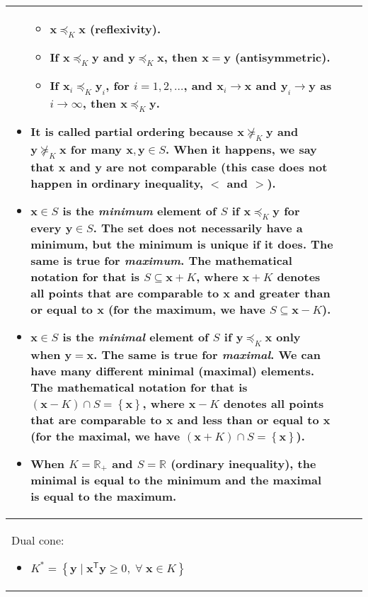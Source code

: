 \documentclass{article}
\begin{document}
\begin{table}[ht!]
\begin{tabularx}{\textwidth}{|A|B|C|}
\begin{itemize}[leftmargin=*]
\begin{itemize}[label={$\triangleright$}]
            \item \(\mathbf{x}\preceq_K \mathbf{x}\) (reflexivity).
            \item If \(\mathbf{x}\preceq_K \mathbf{y}\) and \(\mathbf{y}\preceq_K \mathbf{x}\), then \(\mathbf{x} = \mathbf{y}\) (antisymmetric).
            \item If \(\mathbf{x}_i\preceq_K \mathbf{y}_i\), for \(i = 1, 2, \dots\), and \(\mathbf{x}_i \rightarrow \mathbf{x}\) and \(\mathbf{y}_i \rightarrow \mathbf{y}\) as \(i \rightarrow \infty\), then \(\mathbf{x} \preceq_K \mathbf{y}\).
        \end{itemize}
    \item It is called partial ordering because \(\mathbf{x} \nsucceq_K \mathbf{y}\) and \(\mathbf{y} \nsucceq_K \mathbf{x}\) for many \(\mathbf{x}, \mathbf{y} \in S\). When it happens, we say that \(\mathbf{x}\) and \(\mathbf{y}\) are not comparable (this case does not happen in ordinary inequality, \(<\) and \(>\)).
    \item \(\mathbf{x} \in S\) is the \emph{minimum} element of \(S\) if \(\mathbf{x} \preceq_K \mathbf{y}\) for every \(\mathbf{y} \in S\). The set does not necessarily have a minimum, but the minimum is unique if it does. The same is true for \emph{maximum}. The mathematical notation for that is \(S \subseteq \mathbf{x} + K\), where \(\mathbf{x} + K\) denotes all points that are comparable to \(\mathbf{x}\) and greater than or equal to \(\mathbf{x}\) (for the maximum, we have \(S \subseteq \mathbf{x} - K\)).
    \item \(\mathbf{x} \in S\) is the \emph{minimal} element of \(S\) if \(\mathbf{y} \preceq_K \mathbf{x}\) only when \(\mathbf{y} = \mathbf{x}\). The same is true for \emph{maximal}. We can have many different minimal (maximal) elements. The mathematical notation for that is \((\mathbf{x} - K) \cap S = \left\{ \mathbf{x} \right\}\), where \(\mathbf{x} - K\) denotes all points that are comparable to \(\mathbf{x}\) and less than or equal to \(\mathbf{x}\) (for the maximal, we have \((\mathbf{x} + K) \cap S = \left\{ \mathbf{x} \right\}\)).
    \item When \(K = \mathbb{R}_{+}\) and \(S = \mathbb{R}\) (ordinary inequality), the minimal is equal to the minimum and the maximal is equal to the maximum.
\end{itemize} \\
\hline
Dual cone:
\begin{itemize}
    \item \(K^* = \left\{ \mathbf{y}\mid \mathbf{x}^\mathsf{T}\mathbf{y} \geq 0, \;\forall\; \mathbf{x} \in K \right\}\)

\end{itemize}
\end{tabularx}
\end{table}
\end{document}
